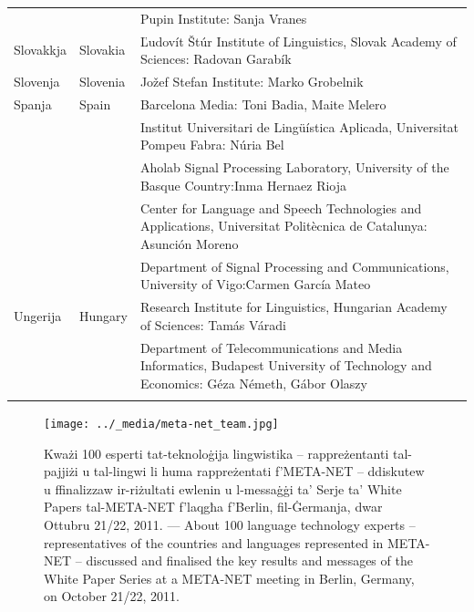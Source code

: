\documentclass[]{../../metanetpaper}
\begin{document}
\begin{longtable}{@{}llp{113mm}@{}}
  & & Pupin Institute: Sanja Vranes \\ \addlinespace  
  Slovakkja & \textcolor{grey1}{Slovakia} & Ľudovít Štúr Institute of Linguistics, Slovak Academy of Sciences: Radovan Garabík \\ \addlinespace 
  Slovenja & \textcolor{grey1}{Slovenia} & Jožef Stefan Institute: Marko Grobelnik \\ \addlinespace 
  Spanja & \textcolor{grey1}{Spain} & Barcelona Media: Toni Badia, Maite Melero \\ \addlinespace 
  & & Institut Universitari de Lingüística Aplicada, Universitat Pompeu Fabra: Núria Bel \\ \addlinespace 
  & & Aholab Signal Processing Laboratory, University of the Basque Country:\newline Inma Hernaez Rioja \\ \addlinespace 
  & & Center for Language and Speech Technologies and Applications, Universitat Politècnica de Catalunya:  Asunción Moreno \\ \addlinespace 
  & & Department of Signal Processing and Communications, University of Vigo:\newline Carmen García Mateo \\ \addlinespace 
  Ungerija & \textcolor{grey1}{Hungary} & Research Institute for Linguistics, Hungarian Academy of Sciences: Tamás Váradi\\  \addlinespace
  & & Department of Telecommunications and Media Informatics, Budapest University of Technology and Economics: Géza Németh, Gábor Olaszy\\ \addlinespace
\end{longtable}
\normalsize

\renewcommand*{\figureformat}{}
\renewcommand*{\captionformat}{}

\begin{figure}[htbp]
  \center
 \texttt{[image: ../\_media/meta-net\_team.jpg]}
 \caption{Kważi 100 esperti tat-teknoloġija lingwistika -- rappreżentanti tal-pajjiżi u tal-lingwi li huma rappreżentati f'META-NET -- ddiskutew u ffinalizzaw ir-riżultati ewlenin u l-messaġġi ta' Serje ta’ White Papers tal-META-NET f'laqgħa f'Berlin, fil-Ġermanja, dwar Ottubru 21/22, 2011. --- \textcolor{grey1}{About 100 language technology experts -- representatives of the countries and languages represented in META-NET -- discussed and finalised the key results and messages of the White Paper Series at a META-NET meeting in Berlin, Germany, on October 21/22, 2011.}}
  \medskip
\end{figure}
\end{document}

